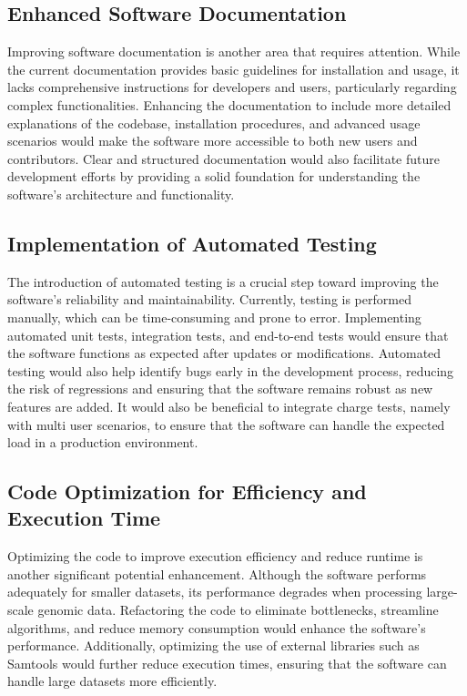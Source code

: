 \subsection{Enhanced Software Documentation}
Improving software documentation is another area that requires attention. While the current documentation provides basic guidelines for installation and usage, it lacks comprehensive instructions for developers and users, particularly regarding complex functionalities. Enhancing the documentation to include more detailed explanations of the codebase, installation procedures, and advanced usage scenarios would make the software more accessible to both new users and contributors. Clear and structured documentation would also facilitate future development efforts by providing a solid foundation for understanding the software's architecture and functionality.

\subsection{Implementation of Automated Testing}
The introduction of automated testing is a crucial step toward improving the software's reliability and maintainability. Currently, testing is performed manually, which can be time-consuming and prone to error. Implementing automated unit tests, integration tests, and end-to-end tests would ensure that the software functions as expected after updates or modifications. Automated testing would also help identify bugs early in the development process, reducing the risk of regressions and ensuring that the software remains robust as new features are added. It would also be beneficial to integrate charge tests, namely with multi user scenarios, to ensure that the software can handle the expected load in a production environment.

\subsection{Code Optimization for Efficiency and Execution Time}
Optimizing the code to improve execution efficiency and reduce runtime is another significant potential enhancement. Although the software performs adequately for smaller datasets, its performance degrades when processing large-scale genomic data. Refactoring the code to eliminate bottlenecks, streamline algorithms, and reduce memory consumption would enhance the software's performance. Additionally, optimizing the use of external libraries such as Samtools would further reduce execution times, ensuring that the software can handle large datasets more efficiently.

